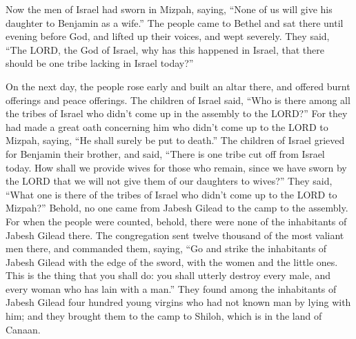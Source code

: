 \mychapter{} \myverse*{}Now the men of Israel had sworn in Mizpah, saying, “None of us
will give his daughter to Benjamin as a wife.”
\myverse{}The people came to Bethel and sat there until evening before God, and lifted
up their voices, and wept severely.
\myverse{}They said, “The LORD, the God of Israel, why has this happened in Israel, that
there should be one tribe lacking in Israel today?”

\myverse{}On the next day, the people rose early and built an altar there,
and offered burnt offerings and peace offerings.
\myverse{}The children of Israel said, “Who is there among all the tribes of Israel who
didn’t come up in the assembly to the LORD?” For they had made a great oath concerning him who didn’t
come up to the LORD to Mizpah, saying, “He shall surely be put to death.”
\myverse{}The children of Israel grieved for Benjamin their brother, and said, “There
is one tribe cut off from Israel today.
\myverse{}How shall we provide wives for those who remain, since we have sworn by the
LORD that we will not give them of our daughters to wives?”
\myverse{}They said, “What one is there of the tribes of Israel who didn’t come up to
the LORD to Mizpah?” Behold, no one came from Jabesh Gilead to the camp to the assembly.
\myverse{}For when the people were counted, behold, there were none of the inhabitants
of Jabesh Gilead there.
\myverse{}The congregation sent twelve thousand of the most valiant men there, and
commanded them, saying, “Go and strike the inhabitants of Jabesh Gilead with the edge of the sword, with
the women and the little ones.
\myverse{}This is the thing that you shall do: you shall utterly destroy every male,
and every woman who has lain with a man.”
\myverse{}They found among the inhabitants of Jabesh Gilead four hundred young virgins
who had not known man by lying with him; and they brought them to the camp to Shiloh, which is in the
land of Canaan.

